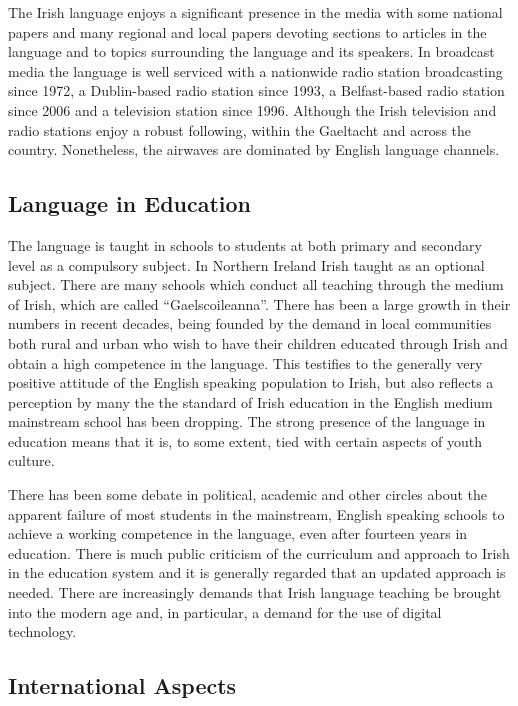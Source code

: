 \begin{multicols}{2}

The Irish language enjoys a significant presence in the media with some national papers and many regional and local papers devoting sections to articles in the language and to topics surrounding the language and its speakers. In broadcast media the language is well serviced with a nationwide radio station broadcasting since 1972, a Dublin-based radio station since 1993, a Belfast-based radio station since 2006 and a television station since 1996. Although the Irish television and radio stations enjoy a robust following, within the Gaeltacht and across the country. Nonetheless, the airwaves are dominated by English language channels.


\subsection{Language in Education}

The language is taught in schools to students at both primary and secondary level as a compulsory subject. In Northern Ireland Irish taught as an optional subject. There are many schools  which conduct all teaching through the medium of Irish, which are called  ``Gaelscoileanna''. There has been a large growth in their numbers in recent decades, being founded by the demand in local communities both rural and urban who wish to have their children educated through Irish and obtain a high competence in the language. This testifies to the generally very positive attitude of the English speaking population to Irish, but also reflects a perception by many the the standard of Irish education in the English medium mainstream school has been dropping. The strong presence of the language in education means that it is, to some extent, tied with certain aspects of youth culture. 

There has been some debate in political, academic and other circles about the apparent failure of most students in the mainstream, English speaking schools to achieve a working competence in the language, even after fourteen years in education. There is much public criticism of the curriculum and approach to Irish in the education system and it is generally regarded that an updated approach is needed. There are increasingly demands that Irish language teaching be brought into the modern age and, in particular, a demand for the use of digital technology.


\subsection{International Aspects}


\end{multicols}
